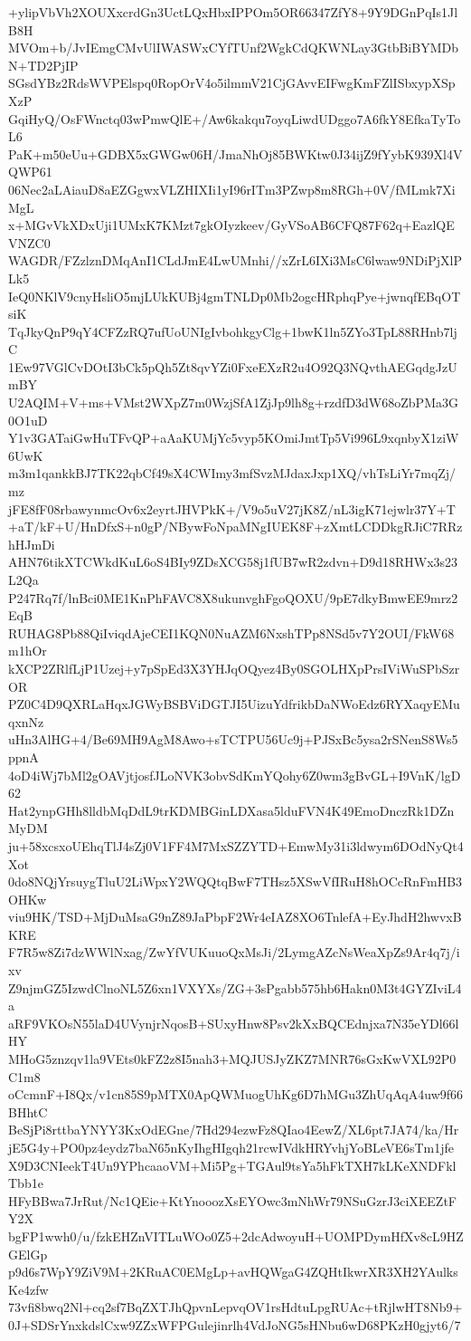 +ylipVbVh2XOUXxcrdGn3UctLQxHbxIPPOm5OR66347ZfY8+9Y9DGnPqIs1JlB8H
MVOm+b/JvIEmgCMvUlIWASWxCYfTUnf2WgkCdQKWNLay3GtbBiBYMDbN+TD2PjIP
SGsdYBz2RdsWVPElspq0RopOrV4o5ilmmV21CjGAvvEIFwgKmFZlISbxypXSpXzP
GqiHyQ/OsFWnctq03wPmwQlE+/Aw6kakqu7oyqLiwdUDggo7A6fkY8EfkaTyToL6
PaK+m50eUu+GDBX5xGWGw06H/JmaNhOj85BWKtw0J34ijZ9fYybK939Xl4VQWP61
06Nec2aLAiauD8aEZGgwxVLZHIXIi1yI96rITm3PZwp8m8RGh+0V/fMLmk7XiMgL
x+MGvVkXDxUji1UMxK7KMzt7gkOIyzkeev/GyVSoAB6CFQ87F62q+EazlQEVNZC0
WAGDR/FZzlznDMqAnI1CLdJmE4LwUMnhi//xZrL6IXi3MsC6lwaw9NDiPjXlPLk5
IeQ0NKlV9cnyHsliO5mjLUkKUBj4gmTNLDp0Mb2ogcHRphqPye+jwnqfEBqOTsiK
TqJkyQnP9qY4CFZzRQ7ufUoUNIgIvbohkgyClg+1bwK1ln5ZYo3TpL88RHnb7ljC
1Ew97VGlCvDOtI3bCk5pQh5Zt8qvYZi0FxeEXzR2u4O92Q3NQvthAEGqdgJzUmBY
U2AQIM+V+ms+VMst2WXpZ7m0WzjSfA1ZjJp9lh8g+rzdfD3dW68oZbPMa3G0O1uD
Y1v3GATaiGwHuTFvQP+aAaKUMjYc5vyp5KOmiJmtTp5Vi996L9xqnbyX1ziW6UwK
m3m1qankkBJ7TK22qbCf49sX4CWImy3mfSvzMJdaxJxp1XQ/vhTsLiYr7mqZj/mz
jFE8fF08rbawynmcOv6x2eyrtJHVPkK+/V9o5uV27jK8Z/nL3igK71ejwlr37Y+T
+aT/kF+U/HnDfxS+n0gP/NBywFoNpaMNgIUEK8F+zXmtLCDDkgRJiC7RRzhHJmDi
AHN76tikXTCWkdKuL6oS4BIy9ZDsXCG58j1fUB7wR2zdvn+D9d18RHWx3s23L2Qa
P247Rq7f/lnBci0ME1KnPhFAVC8X8ukunvghFgoQOXU/9pE7dkyBmwEE9mrz2EqB
RUHAG8Pb88QiIviqdAjeCEI1KQN0NuAZM6NxshTPp8NSd5v7Y2OUI/FkW68m1hOr
kXCP2ZRlfLjP1Uzej+y7pSpEd3X3YHJqOQyez4By0SGOLHXpPrsIViWuSPbSzrOR
PZ0C4D9QXRLaHqxJGWyBSBViDGTJI5UizuYdfrikbDaNWoEdz6RYXaqyEMuqxnNz
uHn3AlHG+4/Be69MH9AgM8Awo+sTCTPU56Uc9j+PJSxBc5ysa2rSNenS8Ws5ppnA
4oD4iWj7bMl2gOAVjtjosfJLoNVK3obvSdKmYQohy6Z0wm3gBvGL+I9VnK/lgD62
Hat2ynpGHh8lldbMqDdL9trKDMBGinLDXasa5lduFVN4K49EmoDnczRk1DZnMyDM
ju+58xcsxoUEhqTlJ4sZj0V1FF4M7MxSZZYTD+EmwMy31i3ldwym6DOdNyQt4Xot
0do8NQjYrsuygTluU2LiWpxY2WQQtqBwF7THsz5XSwVfIRuH8hOCcRnFmHB3OHKw
viu9HK/TSD+MjDuMsaG9nZ89JaPbpF2Wr4eIAZ8XO6TnlefA+EyJhdH2hwvxBKRE
F7R5w8Zi7dzWWlNxag/ZwYfVUKuuoQxMsJi/2LymgAZcNsWeaXpZs9Ar4q7j/ixv
Z9njmGZ5IzwdClnoNL5Z6xn1VXYXs/ZG+3sPgabb575hb6Hakn0M3t4GYZIviL4a
aRF9VKOsN55laD4UVynjrNqosB+SUxyHnw8Psv2kXxBQCEdnjxa7N35eYDl66lHY
MHoG5znzqv1la9VEts0kFZ2z8I5nah3+MQJUSJyZKZ7MNR76sGxKwVXL92P0C1m8
oCcmnF+I8Qx/v1cn85S9pMTX0ApQWMuogUhKg6D7hMGu3ZhUqAqA4uw9f66BHhtC
BeSjPi8rttbaYNYY3KxOdEGne/7Hd294ezwFz8QIao4EewZ/XL6pt7JA74/ka/Hr
jE5G4y+PO0pz4eydz7baN65nKyIhgHIgqh21rcwIVdkHRYvhjYoBLeVE6sTm1jfe
X9D3CNIeekT4Un9YPhcaaoVM+Mi5Pg+TGAul9tsYa5hFkTXH7kLKeXNDFklTbb1e
HFyBBwa7JrRut/Nc1QEie+KtYnooozXsEYOwc3mNhWr79NSuGzrJ3ciXEEZtFY2X
bgFP1wwh0/u/fzkEHZnVITLuWOo0Z5+2dcAdwoyuH+UOMPDymHfXv8cL9HZGElGp
p9d6s7WpY9ZiV9M+2KRuAC0EMgLp+avHQWgaG4ZQHtIkwrXR3XH2YAulksKe4zfw
73vfi8bwq2Nl+cq2sf7BqZXTJhQpvnLepvqOV1rsHdtuLpgRUAc+tRjlwHT8Nb9+
0J+SDSrYnxkdslCxw9ZZxWFPGulejinrlh4VdJoNG5sHNbu6wD68PKzH0gjyt6/7
